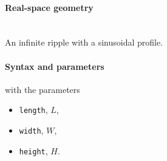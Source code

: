 \paragraph{Real-space geometry}\strut\\
An infinite ripple with a sinusoidal profile.

\begin{figure}[h]
\hfill
{}
\hfill
{}
\hfill
{}
\hfill
\end{figure}

\paragraph{Syntax and parameters}
\begin{quote}
\end{quote}
with the parameters
\begin{itemize}
\item \texttt{length}, $L$, 
\item \texttt{width}, $W$, 
\item \texttt{height}, $H$. 
\end{itemize}


